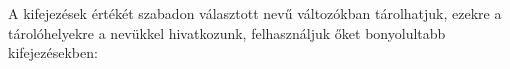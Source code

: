 A kifejezések értékét szabadon választott nevű változókban tárolhatjuk, ezekre a tárolóhelyekre 
a nevükkel hivatkozunk, felhasználjuk őket bonyolultabb kifejezésekben:
